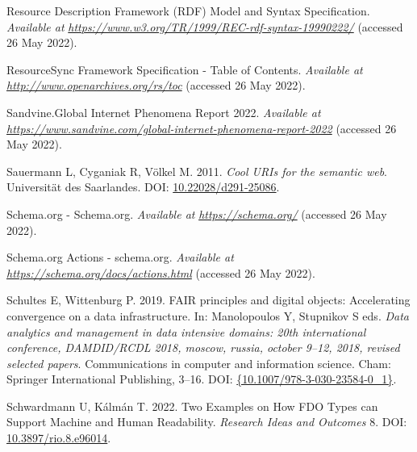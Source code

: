 \begin{CSLReferences}{1}{0}
\leavevmode{}%
Resource Description Framework (RDF) Model and Syntax Specification. \emph{Available at} \href{https://www.w3.org/TR/1999/REC-rdf-syntax-19990222/}{\emph{https://www.w3.org/TR/1999/REC-rdf-syntax-19990222/}} (accessed 26 May 2022).

\leavevmode{}%
ResourceSync Framework Specification - Table of Contents. \emph{Available at} \href{http://www.openarchives.org/rs/toc}{\emph{http://www.openarchives.org/rs/toc}} (accessed 26 May 2022).

\leavevmode{}%
Sandvine.Global Internet Phenomena Report 2022. \emph{Available at} \href{https://www.sandvine.com/global-internet-phenomena-report-2022}{\emph{https://www.sandvine.com/global-internet-phenomena-report-2022}} (accessed 26 May 2022).

\leavevmode{}%
Sauermann L, Cyganiak R, Völkel M. 2011. \emph{Cool URIs for the semantic web}. Universität des Saarlandes. DOI: \href{https://doi.org/10.22028/d291-25086}{10.22028/d291-25086}.

\leavevmode{}%
Schema.org - Schema.org. \emph{Available at} \href{https://schema.org/}{\emph{https://schema.org/}} (accessed 26 May 2022).

\leavevmode{}%
Schema.org Actions - schema.org. \emph{Available at} \href{https://schema.org/docs/actions.html}{\emph{https://schema.org/docs/actions.html}} (accessed 26 May 2022).

\leavevmode{}%
Schultes E, Wittenburg P. 2019. FAIR principles and digital objects: Accelerating convergence on a data infrastructure. In: Manolopoulos Y, Stupnikov S eds. \emph{Data analytics and management in data intensive domains: 20th international conference, DAMDID/RCDL 2018, moscow, russia, october 9--12, 2018, revised selected papers}. Communications in computer and information science. Cham: Springer International Publishing, 3--16. DOI: \href{https://doi.org/\%7B10.1007/978-3-030-23584-0_1\%7D}{\{10.1007/978-3-030-23584-0\_1\}}.

\leavevmode{}%
Schwardmann U, Kálmán T. 2022. Two Examples on How FDO Types can Support Machine and Human Readability. \emph{Research Ideas and Outcomes} 8. DOI: \href{https://doi.org/10.3897/rio.8.e96014}{10.3897/rio.8.e96014}.


\end{CSLReferences}
